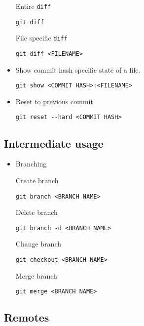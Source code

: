 \documentclass[11pt]{article}
\begin{document}
\begin{itemize}
     Entire \texttt{diff}

\begin{verbatim}
git diff
\end{verbatim}

     File specific \texttt{diff}

\begin{verbatim}
git diff <FILENAME>
\end{verbatim}
\item Show commit hash specific state of a file.

\begin{verbatim}
git show <COMMIT HASH>:<FILENAME>
\end{verbatim}
\item Reset to previous commit

\begin{verbatim}
git reset --hard <COMMIT HASH>
\end{verbatim}
\end{itemize}
\subsection{Intermediate usage}
\label{sec-2-2}

\begin{itemize}
\item Branching

     Create branch

\begin{verbatim}
git branch <BRANCH NAME>
\end{verbatim}

     Delete branch

\begin{verbatim}
git branch -d <BRANCH NAME>
\end{verbatim}

     Change branch

\begin{verbatim}
git checkout <BRANCH NAME>
\end{verbatim}

     Merge branch

\begin{verbatim}
git merge <BRANCH NAME>
\end{verbatim}
\end{itemize}
\subsection{Remotes}
\label{sec-2-3}
\end{document}
